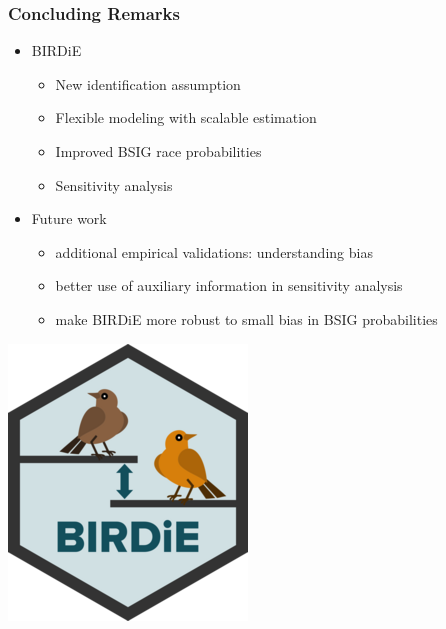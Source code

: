\documentclass[handout]{beamer}
\begin{document}
\begin{frame}

  \frametitle{Concluding Remarks}

  \begin{itemize}
  \item BIRDiE
    \begin{itemize}
    \item New identification assumption
    \item Flexible modeling with scalable estimation
    \item Improved BSIG race probabilities
    \item Sensitivity analysis
    \end{itemize}
    \vfill

  \item Future work
    \begin{itemize}
    \item additional empirical validations: understanding bias
    \item better use of auxiliary information in sensitivity analysis
    \item make BIRDiE more robust to small bias in BSIG probabilities

    \end{itemize}
  \end{itemize}

  \vfill
  \vspace{-.7in}
  \begin{flushright}
     \includegraphics[scale=0.165]{../man/figures/logo.png}
  \end{flushright}
\end{frame}
\end{document}
